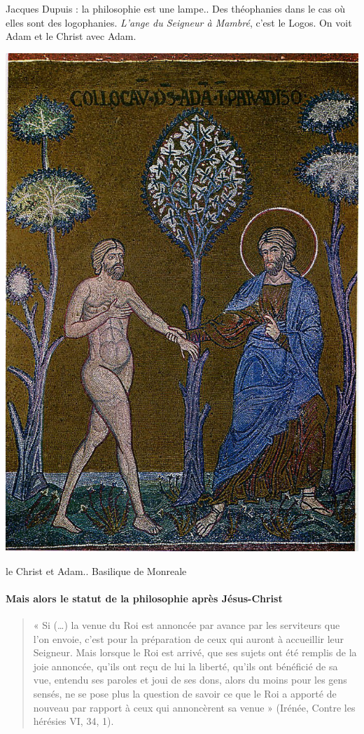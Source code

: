  Jacques Dupuis : la philosophie est une lampe.. Des théophanies dans le cas où elles sont des logophanies. \textit{L'ange du Seigneur à Mambré}, c'est le Logos.
 On voit Adam et le Christ avec Adam.

\begin{marginfigure}
    \centering

    \includegraphics[width=\textwidth]{ChristologiePluraliste/Images/MonrealeAdam.jpg}
        \caption{le Christ et Adam.. Basilique de Monreale}
    \label{fig:my_label}
\end{marginfigure}


\paragraph{Mais alors le statut de la philosophie après Jésus-Christ}
 \begin{quote}
    « Si (…) la venue du Roi est annoncée par avance par les serviteurs que l’on envoie, c’est
pour la préparation de ceux qui auront à accueillir leur Seigneur. Mais lorsque le Roi est
arrivé, que ses sujets ont été remplis de la joie annoncée, qu’ils ont reçu de lui la liberté, qu’ils
ont bénéficié de sa vue, entendu ses paroles et joui de ses dons, alors du moins pour les gens
sensés, ne se pose plus la question de savoir ce que le Roi a apporté de nouveau par rapport à
ceux qui annoncèrent sa venue » (Irénée, Contre les hérésies VI, 34, 1).
\end{quote}



